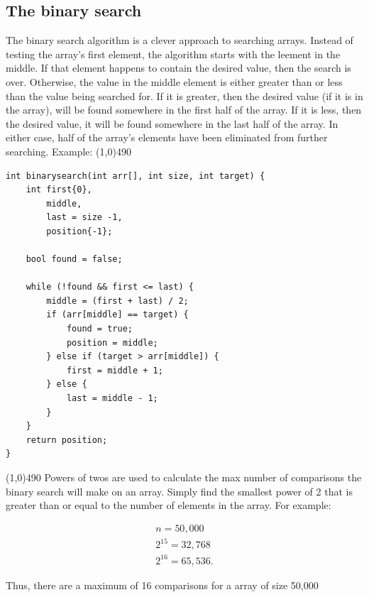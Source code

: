 \documentclass{report}
\begin{document}
    \subsection{The binary search}
    \bigbreak \noindent 
    The binary search algorithm is a clever approach to searching arrays. Instead of testing the array's first element, the algorithm starts with the leement in the middle. If that element happens to contain the desired value, then the search is over. Otherwise, the value in the middle element is either greater than or less than the value being searched for. If it is greater, then the desired value (if it is in the array), will be found somewhere in the first half of the array. If it is less, then the desired value, it will be found somewhere in the last half of the array. In either case, half of the array's elements have been eliminated from further searching.
    \bigbreak \noindent 
    \bigbreak \noindent 
    Example:
    \bigbreak \noindent 
    \line(1,0){490}
    \begin{verbatim}
int binarysearch(int arr[], int size, int target) {
    int first{0}, 
        middle,
        last = size -1,
        position{-1};

    bool found = false;

    while (!found && first <= last) {
        middle = (first + last) / 2;
        if (arr[middle] == target) {
            found = true;
            position = middle;
        } else if (target > arr[middle]) {
            first = middle + 1;
        } else {
            last = middle - 1;
        }
    }
    return position;
}
    \end{verbatim}
    \line(1,0){490}
    \bigbreak \noindent 
    Powers of twos are used to calculate the max number of comparisons the binary search will make on an array. Simply find the smallest power of 2 that is greater than or equal to the number of elements in the array. For example:
    \bigbreak \noindent 
    \begin{minipage}[]{0.47\textwidth}
    \begin{align*}
        n = 50,000 \\
        2^{15} = 32,768 \\
        2^{16} = 65,536
    .\end{align*}
    \end{minipage}
    \begin{minipage}[t]{0.47\textwidth}
        Thus, there are a maximum of 16 comparisons for a array of size 50,000
    \end{minipage}
\end{document}
